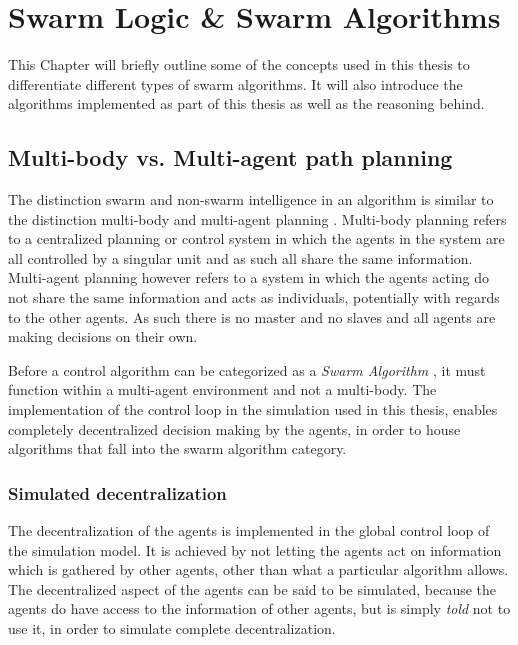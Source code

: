 
\chapter{Swarm Logic \& Swarm Algorithms}
\label{chap:swarm}

This Chapter will briefly outline some of the concepts used in this thesis to differentiate different types of swarm algorithms. It will also introduce the algorithms implemented as part of this thesis as well as the reasoning behind. 

\section{Multi-body vs. Multi-agent path planning}

The distinction swarm and non-swarm intelligence in an algorithm is similar to the distinction multi-body and multi-agent planning \cite{bhattacharya_multi-agent_2010}. Multi-body planning refers to a centralized planning or control system in which the agents in the system are all controlled by a singular unit and as such all share the same information. Multi-agent planning however refers to a system in which the agents acting do not share the same information and acts as individuals, potentially with regards to the other agents. As such there is no master and no slaves and all agents are making decisions on their own. 

Before a control algorithm can be categorized as a \textit{Swarm Algorithm} \cite{bhattacharya_multi-agent_2010}, it must function within a multi-agent environment and not a multi-body. The implementation of the control loop in the simulation used in this thesis, enables completely decentralized decision making by the agents, in order to house algorithms that fall into the swarm algorithm category.  

\subsection{Simulated decentralization}
The decentralization of the agents is implemented in the global control loop of the simulation model. It is achieved by not letting the agents act on information which is gathered by other agents, other than what a particular algorithm allows. The decentralized aspect of the agents can be said to be simulated, because the agents do have access to the information of other agents, but is simply \textit{told} not to use it, in order to simulate complete decentralization. 

